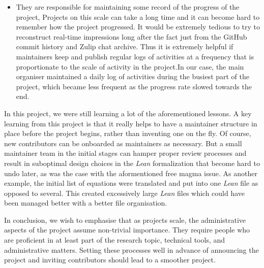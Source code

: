 \begin{itemize}
    \item They are responsible for maintaining some record of the progress of the project, Projects on this scale can take a long time and it can become hard to remember how the project progressed. It would be extremely tedious to try to reconstruct real-time impressions long after the fact just from the GitHub commit history and Zulip chat archive. Thus it is extremely helpful if maintainers keep and publish regular logs of activities at a frequency that is proportionate to the scale of activity in the project.In our case, the main organiser maintained a daily log of activities during the busiest part of the project, which became less frequent as the progress rate slowed towards the end.
\end{itemize}

In this project, we were still learning a lot of the aforementioned lessons. A key learning from this project is that it really helps to have a maintainer structure in place before the project begins, rather than inventing one on the fly. Of course, new contributors can be onboarded as maintainers as necessary. But a small maintainer team in the initial stages can hamper proper review processes and result in suboptimal design choices in the  \emph{Lean} formalization that become hard to undo later, as was the case with the aformentioned free magma issue. As another example, the initial list of equations were translated and put into one  \emph{Lean} file as opposed to several. This created excessively large  \emph{Lean} files which could have been managed better with a better file organisation.

In conclusion, we wish to emphasise that as projects scale, the administrative aspects of the project assume non-trivial importance. They require people who are proficient in at least part of the research topic, technical tools, and administrative matters. Setting these processes well in advance of announcing the project and inviting contributors should lead to a smoother project.

